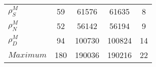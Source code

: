 \begin{center}
\begin{longtable}{lcccc}
$ {\rho^{M}_{S}}       $	 & 	                   59	 & 	                61576	 & 	                61635	 & 	                    8 \\ 
$ {\rho^{M}_{N}}       $	 & 	                   52	 & 	                56142	 & 	                56194	 & 	                    9 \\ 
$ {\rho^{M}_{D}}       $	 & 	                   94	 & 	               100730	 & 	               100824	 & 	                   14 \\ 
$Maximum               $	 & 	                  180	 & 	               190036	 & 	               190216	 & 	                   22 \\ 
\end{longtable}
 \end{center}
